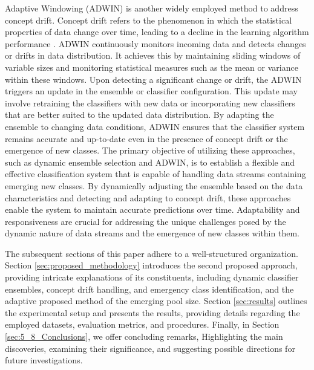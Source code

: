 Adaptive Windowing (ADWIN) is another widely employed method to address concept drift. Concept drift refers to the phenomenon in which the statistical properties of data change over time, leading to a decline in the learning algorithm performance \cite{gama2004learning, adams2023explainable, madkour2023historical}. ADWIN continuously monitors incoming data and detects changes or drifts in data distribution. It achieves this by maintaining sliding windows of variable sizes and monitoring statistical measures such as the mean or variance within these windows. Upon detecting a significant change or drift, the ADWIN triggers an update in the ensemble or classifier configuration. This update may involve retraining the classifiers with new data or incorporating new classifiers that are better suited to the updated data distribution. By adapting the ensemble to changing data conditions, ADWIN ensures that the classifier system remains accurate and up-to-date even in the presence of concept drift or the emergence of new classes. The primary objective of utilizing these approaches, such as dynamic ensemble selection and ADWIN, is to establish a flexible and effective classification system that is capable of handling data streams containing emerging new classes. By dynamically adjusting the ensemble based on the data characteristics and detecting and adapting to concept drift, these approaches enable the system to maintain accurate predictions over time. Adaptability and responsiveness are crucial for addressing the unique challenges posed by the dynamic nature of data streams and the emergence of new classes within them.

The subsequent sections of this paper adhere to a well-structured organization. Section \ref{sec:proposed_methodology} introduces the second proposed approach, providing intricate explanations of its constituents, including dynamic classifier ensembles, concept drift handling, and emergency class identification, and the adaptive proposed method of the emerging pool size. Section \ref{sec:results} outlines the experimental setup and presents the results, providing details regarding the employed datasets, evaluation metrics, and procedures. Finally, in Section \ref{sec:5_8_Conclusions}, we offer concluding remarks, Highlighting the main discoveries, examining their significance, and suggesting possible directions for future investigations.
  
  
